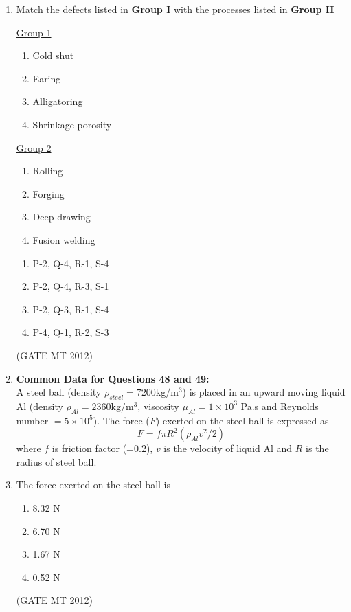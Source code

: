 \documentclass[journal, 11pt, onecolumn]{IEEEtran}
\theoremstyle{remark}
\begin{document}
\begin{enumerate}
\begin{enumerate}
\item Match the defects listed in \textbf{Group I} with the processes listed in \textbf{Group II}

\begin{multicols}{2}
\underline{Group 1}
\begin{enumerate}[label=(\Alph*), start=16]
\item Cold shut  
\item Earing
\item Alligatoring  
\item Shrinkage porosity
\end{enumerate}

\underline{Group 2}
\begin{enumerate}[label=(\arabic*), start=1]
\item Rolling 
\item Forging 
\item Deep drawing
\item Fusion welding
\end{enumerate}
\end{multicols}

\begin{multicols}{2}
\begin{enumerate}
\item P-2, Q-4, R-1, S-4
\item P-2, Q-4, R-3, S-1
\item P-2, Q-3, R-1, S-4
\item P-4, Q-1, R-2, S-3
\end{enumerate}
\end{multicols}
\hfill(GATE MT 2012)

\item[] \textbf{Common Data for Questions 48 and 49:} \\
A steel ball (density $\rho_{steel}=7200$kg/m$^3$) is placed in an upward moving liquid Al (density $\rho_{Al}=2360$kg/m$^3$, viscosity $\mu_{Al}=1\times10^3$ Pa.s and Reynolds number $=5\times10^5$). The force ($F$) exerted on the steel ball is expressed as \\
\[
    F = f \pi R^2 \left( \rho_{Al}v^2/2 \right)
\]
where $f$ is friction factor (=0.2), $v$ is the velocity of liquid Al and $R$ is the radius of steel ball.

\item The force exerted on the steel ball is
\begin{multicols}{2}
\begin{enumerate}  
\item 8.32 N
\item 6.70 N
\item 1.67 N
\item 0.52 N
\end{enumerate}
\end{multicols}
\hfill(GATE MT 2012)


\end{enumerate}
\end{enumerate}
\end{document}
